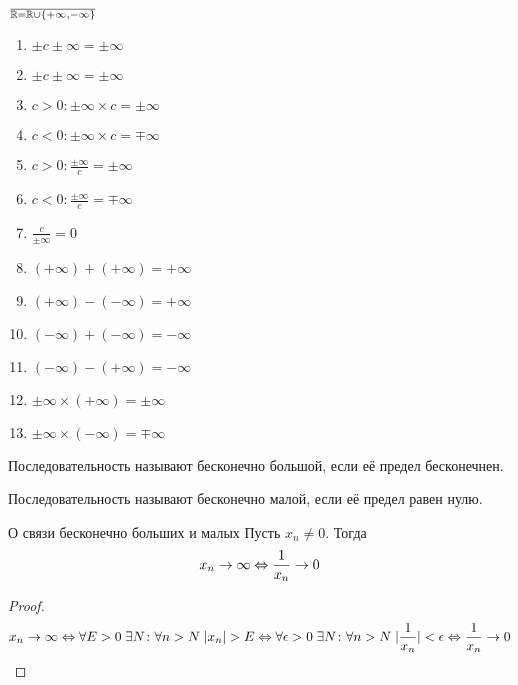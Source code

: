\begin{Rem}
$\over{\mathbb{R}} = \mathbb{R} \cup \{+\infty, -\infty\}$
\begin{enumerate}
\item $\pm c\pm\infty = \pm\infty$
\item $\pm c\pm\infty = \pm\infty$
\item $c>0\colon \pm \infty \times c = \pm \infty$
\item $c<0\colon \pm \infty \times c = \mp \infty$
\item $c>0\colon \frac{\pm \infty}{c} = \pm \infty$
\item $c<0\colon \frac{\pm \infty}{c} = \mp \infty$
\item $\frac{c}{\pm \infty} = 0$
\item $(+\infty) + (+\infty) = +\infty$
\item $(+\infty) - (-\infty) = +\infty$
\item $(-\infty) + (-\infty) = -\infty$
\item $(-\infty) - (+\infty) = -\infty$
\item $\pm \infty \times (+ \infty) = \pm \infty$
\item $\pm \infty \times (- \infty) = \mp \infty$
\end{enumerate}
\end{Rem}

\begin{Def}
Последовательность называют бесконечно большой, если её предел бесконечнен.
\end{Def}
\begin{Def}
Последовательность называют бесконечно малой, если её предел равен нулю.
\end{Def}

\begin{theorem}{О связи бесконечно больших и малых}
Пусть $x_n \ne 0$. Тогда
$$x_n \rightarrow \infty \Leftrightarrow \frac1{x_n} \rightarrow 0$$
\end{theorem}
\begin{proof}
$$x_n \rightarrow \infty \Leftrightarrow \forall E > 0\; \exists N\colon \forall n > N\; |x_n| > E \Leftrightarrow \forall \epsilon > 0\; \exists N\colon \forall n > N\; |\frac1{x_n}| < \epsilon \Leftrightarrow 
\frac1{x_n} \rightarrow 0$$
\end{proof}

